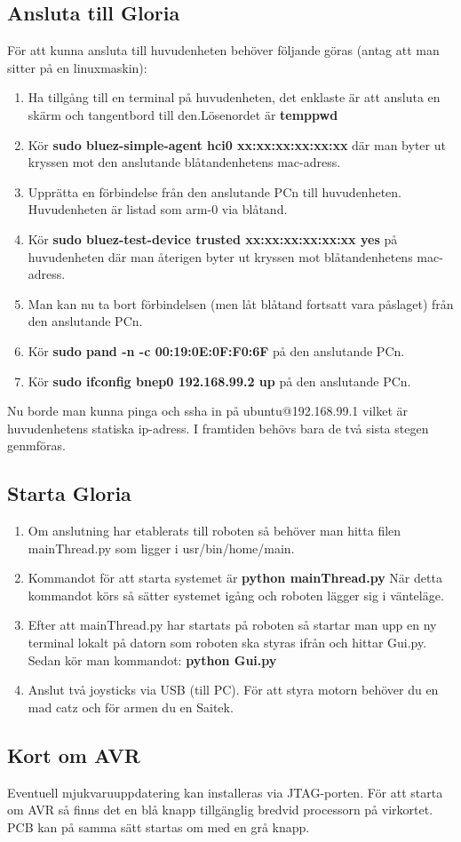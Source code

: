 \subsection{Ansluta till Gloria}
För att kunna ansluta till huvudenheten behöver följande göras (antag att man sitter på en linuxmaskin):
\begin{enumerate}
	\item Ha tillgång till en terminal på huvudenheten, det enklaste är att ansluta en skärm och tangentbord till den.\newline Lösenordet är \textbf{temppwd}
	\item Kör \textbf{sudo bluez-simple-agent hci0 xx:xx:xx:xx:xx:xx} där man byter ut kryssen mot den anslutande blåtandenhetens mac-adress.
	\item Upprätta en förbindelse från den anslutande PCn till huvudenheten. Huvudenheten är listad som arm-0 via blåtand.
	\item Kör \textbf{sudo bluez-test-device trusted xx:xx:xx:xx:xx:xx yes} på huvudenheten där man återigen byter ut kryssen mot blåtandenhetens mac-adress.
	\item Man kan nu ta bort förbindelsen (men låt blåtand fortsatt vara påslaget) från den anslutande PCn.
	\item Kör \textbf{sudo pand -n -c 00:19:0E:0F:F0:6F	} på den anslutande PCn.
	\item Kör \textbf{sudo ifconfig bnep0 192.168.99.2 up } på den anslutande PCn.
\end{enumerate}
Nu borde man kunna pinga och ssha in på ubuntu@192.168.99.1 vilket är huvudenhetens statiska ip-adress. I framtiden behövs bara de två sista stegen genmföras.
\subsection{Starta Gloria}
\begin{enumerate}
	\item Om anslutning har etablerats till roboten så behöver man hitta filen mainThread.py som ligger i usr/bin/home/main.
	\item Kommandot för att starta systemet är \textbf{python mainThread.py}
	När detta kommandot körs så sätter systemet igång och roboten lägger sig i vänteläge.
	\item Efter att mainThread.py har startats på roboten så startar man upp en ny terminal lokalt på datorn som roboten ska styras ifrån och hittar Gui.py. Sedan kör man kommandot: \textbf{python Gui.py}
	\item Anslut två joysticks via USB (till PC). För att styra motorn behöver du en mad catz och för armen du en Saitek.
\end{enumerate}
\subsection{Kort om AVR}
Eventuell mjukvaruuppdatering kan installeras via JTAG-porten.
\newline
För att starta om AVR så finns det en blå knapp tillgänglig bredvid processorn på virkortet. PCB kan på samma sätt startas om med en grå knapp.
